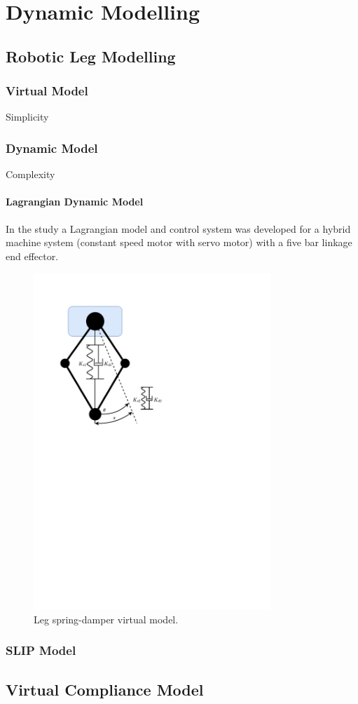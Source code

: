 \chapter{Dynamic Modelling}

\section{Robotic Leg Modelling}

\subsection{Virtual Model}
Simplicity 
\subsection{Dynamic Model}
Complexity
\subsubsection{Lagrangian Dynamic Model}
In the study \cite{Yu2006} a Lagrangian model and control system was developed for a hybrid machine system (constant speed motor with servo motor) with a five bar linkage end effector. 

\begin{figure}
\centering
\includegraphics[clip, trim=2cm 15cm 9cm 2cm, page = 1, width=0.8\textwidth]{images/geometry/leg-spring-damper} 
\caption{Leg spring-damper virtual model.}
\label{fig:Leg spring-damper virtual model}
\end{figure}

\subsection{SLIP Model}
\section{Virtual Compliance Model}